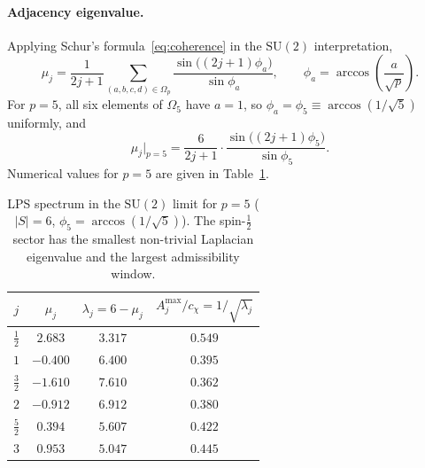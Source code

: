     \paragraph{Adjacency eigenvalue.}
      Applying Schur's formula~\eqref{eq:coherence} in the $\mathrm{SU}(2)$
      interpretation,
    \begin{equation}
      \mu_j = \frac{1}{2j+1}\sum_{(a,b,c,d)\in\Omega_p}
      \frac{\sin\!\bigl((2j+1)\phi_{a}\bigr)}{\sin\phi_{a}},
      \qquad
      \phi_a = \arccos\!\left(\frac{a}{\sqrt{p}}\right).
      \label{eq:mu-lps-su2}
      \end{equation}
      For $p = 5$, all six elements of $\Omega_5$ have $a = 1$, so $\phi_a =
  \phi_5 \equiv \arccos(1/\sqrt{5})$ uniformly, and
    \begin{equation}
      \mu_j\big|_{p=5}
      = \frac{6}{2j+1}\cdot\frac{\sin\!\bigl((2j+1)\phi_5\bigr)}{\sin\phi_5}.
      \label{eq:mu-p5}
      \end{equation}
      Numerical values for $p = 5$ are given in Table~\ref{tab:lps-spectrum-p5}.

    \begin{table}[h]
      \centering
      \renewcommand{\arraystretch}{1.25}
      \begin{tabular}{cccc}
        \hline
        $j$            & $\mu_j$  & $\lambda_j = 6 - \mu_j$ & $A^{\max}_j/c_\chi = 1/\!\sqrt{\lambda_j}$ \\
        \hline
        $\tfrac{1}{2}$ & $2.683$  & $3.317$                 & $0.549$                                    \\
        $1$            & $-0.400$ & $6.400$                 & $0.395$                                    \\
        $\tfrac{3}{2}$ & $-1.610$ & $7.610$                 & $0.362$                                    \\
        $2$            & $-0.912$ & $6.912$                 & $0.380$                                    \\
        $\tfrac{5}{2}$ & $0.394$  & $5.607$                 & $0.422$                                    \\
        $3$            & $0.953$  & $5.047$                 & $0.445$                                    \\
        \hline
      \end{tabular}
      \caption{LPS spectrum in the $\mathrm{SU}(2)$ limit for $p = 5$
        ($|S| = 6$, $\phi_5 = \arccos(1/\!\sqrt{5})$).
        The spin-$\tfrac{1}{2}$ sector has the smallest non-trivial Laplacian
        eigenvalue and the largest admissibility window.}
      \label{tab:lps-spectrum-p5}
      \end{table}


